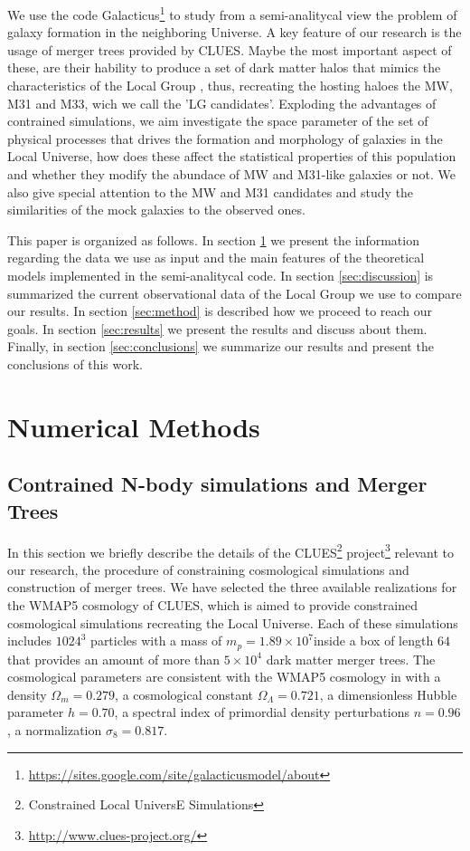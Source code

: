 \documentclass[usenatbib]{mn2e}
\newcommand{\hMpc}{{\ifmmode{h^{-1}{\rm Mpc}}\else{$h^{-1}$Mpc }\fi}}
\newcommand{\hMsun}{{\ifmmode{h^{-1}{\rm {M_{\odot}}}}\else{$h^{-1}{\rm{M_{\odot}}}$}\fi}}
\begin{document}
We use the code
Galacticus\footnote{\url{https://sites.google.com/site/galacticusmodel/about}}
to study from a semi-analitycal view the problem of galaxy formation
in the neighboring Universe.  A key feature of our research is the
usage of merger trees provided by CLUES. Maybe the most important
aspect of these, are their hability to produce a set of dark matter
halos that mimics the characteristics of the Local Group , thus,
recreating the hosting haloes the MW, M31 and M33, wich we call the
'LG candidates'. Exploding the advantages of contrained simulations,
we aim investigate the space parameter of the set of physical
processes that drives the formation and morphology of  galaxies in the
Local Universe, how does these  affect the statistical properties of
this population and  whether they modify the abundace of MW and
M31-like galaxies or not. We also give special attention to the MW and
M31 candidates and study the similarities of the mock galaxies to the
observed ones. 


This paper is organized as follows. In section \ref{sec:numerical} we
present the information regarding the data we use as input and the
main features of the theoretical models implemented in the
semi-analitycal code. In section \ref{sec:discussion} is summarized
the current observational data of the Local Group we use to compare
our results. In section \ref{sec:method} is described how we proceed
to reach our goals. In section \ref{sec:results} we present the
results and discuss about them. Finally, in section
\ref{sec:conclusions} we summarize our results and present the
conclusions of this work.
  

\section{Numerical Methods}
\label{sec:numerical}

\subsection{Contrained N-body simulations and Merger Trees}
\label{sec:simulations}

In this section we briefly describe the details of the
CLUES\footnote{Constrained Local UniversE Simulations}
project\footnote{\url{http://www.clues-project.org/}} relevant to our
research, the procedure of constraining cosmological simulations and
construction of merger trees.  We have selected the three available
realizations for the WMAP5 cosmology of CLUES, which is aimed to
provide constrained cosmological simulations recreating the Local
Universe. Each of these simulations includes $1024^3$ particles with a
mass of $m_{p}=1.89\times 10^{7}$\hMsun inside a box of length
$64$\hMpc  that provides an amount of more than $5\times 10^4$ dark
matter merger trees. The cosmological parameters are consistent with
the WMAP5 cosmology in  \cite{2009ApJS..180..330K} with a density
$\Omega_{m}=0.279$, a cosmological constant $\Omega_{\Lambda} =
0.721$, a dimensionless Hubble parameter $h=0.70$, a spectral index of
primordial density perturbations $n=0.96$, a normalization
$\sigma_{8}=0.817$.  
\end{document}
